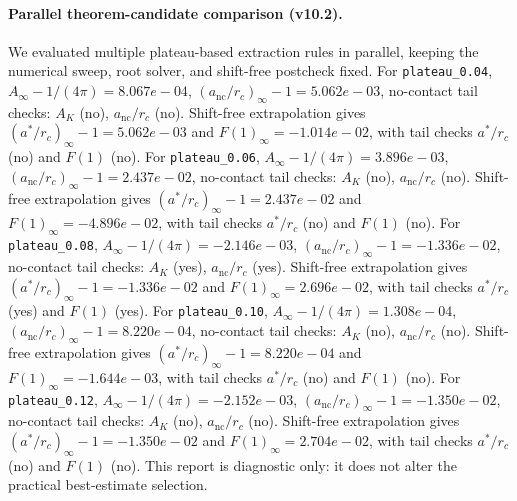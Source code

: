 \paragraph{Parallel theorem-candidate comparison (v10.2).}
We evaluated multiple plateau-based extraction rules in parallel, keeping the numerical sweep, root solver, and shift-free postcheck fixed. For \texttt{plateau_0.04}, $A_\infty-1/(4\pi)=8.067e-04$, $(a_{\mathrm{nc}}/r_c)_\infty-1=5.062e-03$, no-contact tail checks: $A_K$ (no), $a_{\mathrm{nc}}/r_c$ (no). Shift-free extrapolation gives $(a^*/r_c)_\infty-1=5.062e-03$ and $F(1)_\infty=-1.014e-02$, with tail checks $a^*/r_c$ (no) and $F(1)$ (no). For \texttt{plateau_0.06}, $A_\infty-1/(4\pi)=3.896e-03$, $(a_{\mathrm{nc}}/r_c)_\infty-1=2.437e-02$, no-contact tail checks: $A_K$ (no), $a_{\mathrm{nc}}/r_c$ (no). Shift-free extrapolation gives $(a^*/r_c)_\infty-1=2.437e-02$ and $F(1)_\infty=-4.896e-02$, with tail checks $a^*/r_c$ (no) and $F(1)$ (no). For \texttt{plateau_0.08}, $A_\infty-1/(4\pi)=-2.146e-03$, $(a_{\mathrm{nc}}/r_c)_\infty-1=-1.336e-02$, no-contact tail checks: $A_K$ (yes), $a_{\mathrm{nc}}/r_c$ (yes). Shift-free extrapolation gives $(a^*/r_c)_\infty-1=-1.336e-02$ and $F(1)_\infty=2.696e-02$, with tail checks $a^*/r_c$ (yes) and $F(1)$ (yes). For \texttt{plateau_0.10}, $A_\infty-1/(4\pi)=1.308e-04$, $(a_{\mathrm{nc}}/r_c)_\infty-1=8.220e-04$, no-contact tail checks: $A_K$ (no), $a_{\mathrm{nc}}/r_c$ (no). Shift-free extrapolation gives $(a^*/r_c)_\infty-1=8.220e-04$ and $F(1)_\infty=-1.644e-03$, with tail checks $a^*/r_c$ (no) and $F(1)$ (no). For \texttt{plateau_0.12}, $A_\infty-1/(4\pi)=-2.152e-03$, $(a_{\mathrm{nc}}/r_c)_\infty-1=-1.350e-02$, no-contact tail checks: $A_K$ (no), $a_{\mathrm{nc}}/r_c$ (no). Shift-free extrapolation gives $(a^*/r_c)_\infty-1=-1.350e-02$ and $F(1)_\infty=2.704e-02$, with tail checks $a^*/r_c$ (no) and $F(1)$ (no). This report is diagnostic only: it does not alter the practical best-estimate selection.
